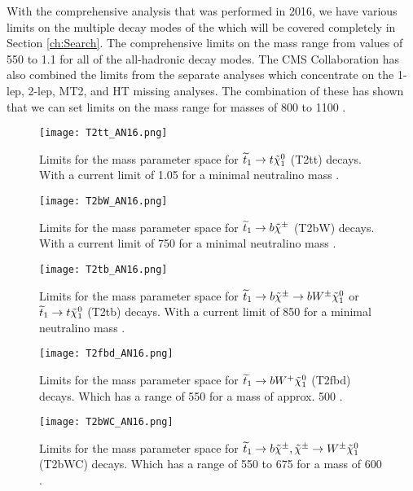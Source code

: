 With the comprehensive analysis that was performed in 2016, we have various limits on the multiple decay modes of the \st{} which will be covered completely in Section \ref{ch:Search}. The comprehensive limits on the \st{} mass range from values of 550 to 1.1 \TeV{} for all of the all-hadronic decay modes. The CMS Collaboration has also combined the limits from the separate analyses which concentrate on the 1-lep, 2-lep, MT2, and HT missing analyses. The combination of these has shown that we can set limits on the \st{} mass range for masses of 800 to 1100 \GeV. 

\begin{figure}
\centering
	\texttt{[image: T2tt\_AN16.png]}
 	\caption[T2tt Limits]{Limits for the mass parameter space for $\widetilde{t}_1\rightarrow t \tilde{\chi}^{0}_{1}$ (T2tt) decays. With a current limit of 1.05 \TeV{} for a minimal neutralino mass \cite{sirunyan_search_2017}.}
 	\label{T2ttANLimits} 
\end{figure}

\begin{figure}
\centering
	\texttt{[image: T2bW\_AN16.png]}
 	\caption[T2bW Limits]{Limits for the mass parameter space for $\widetilde{t}_1\rightarrow b \tilde{\chi}^{\pm}$ (T2bW) decays. With a current limit of 750 \GeV{} for a minimal neutralino mass \cite{sirunyan_search_2017}.}
 	\label{T2bWANLimits} 
\end{figure}

\begin{figure}
\centering
	\texttt{[image: T2tb\_AN16.png]}
 	\caption[T2tb Limits]{Limits for the mass parameter space for $\widetilde{t}_1\rightarrow b \tilde{\chi}^{\pm}\rightarrow bW^\pm\tilde{\chi}^{0}_{1}$ or $\widetilde{t}_1\rightarrow t\tilde{\chi}^{0}_{1}$ (T2tb) decays. With a current limit of 850 \GeV{} for a minimal neutralino mass \cite{sirunyan_search_2017}.}
 	\label{T2tbANLimits} 
\end{figure}

\begin{figure}
\centering
	\texttt{[image: T2fbd\_AN16.png]}
 	\caption[T2fbd Limits]{Limits for the mass parameter space for $\widetilde{t}_1\rightarrow b W^+ \tilde{\chi}^{0}_{1}$ (T2fbd) decays. Which has a range of 550 \GeV{} for a \neutralino{} mass of approx. 500 \GeV{} \cite{sirunyan_search_2017}.}
 	\label{T2fbdANLimits} 
\end{figure}

\begin{figure}
\centering
	\texttt{[image: T2bWC\_AN16.png]}
 	\caption[T2bWC Limits]{Limits for the mass parameter space for $\widetilde{t}_1\rightarrow b\tilde{\chi}^{\pm}, \tilde{\chi}^{\pm}\rightarrow W ^\pm\tilde{\chi}^{0}_{1}$ (T2bWC) decays. Which has a range of 550 to 675 \GeV{} for a \neutralino{} mass of 600 \GeV{} \cite{sirunyan_search_2017}.}
 	\label{T2bWCANLimits} 
\end{figure}

